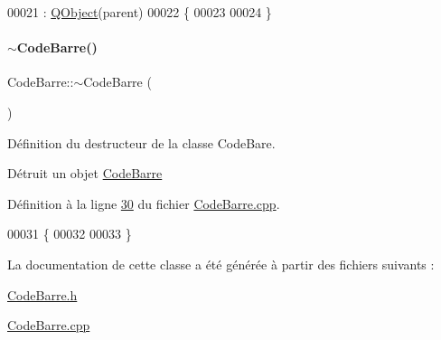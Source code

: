 \begin{DoxyCode}
00021                                     : \hyperlink{class_q_object}{QObject}(parent)
00022 \{
00023 
00024 \}
\end{DoxyCode}
\mbox{\label{class_code_barre_a5bb3df2e5c7fba829f0274da4c359f6c}} 
\paragraph{\texorpdfstring{$\sim$\+Code\+Barre()}{~CodeBarre()}}
{\footnotesize\ttfamily Code\+Barre\+::$\sim$\+Code\+Barre (\begin{DoxyParamCaption}{ }\end{DoxyParamCaption})}



Définition du destructeur de la classe Code\+Bare. 

Détruit un objet \hyperlink{class_code_barre}{Code\+Barre} 

Définition à la ligne \hyperlink{_code_barre_8cpp_source_l00030}{30} du fichier \hyperlink{_code_barre_8cpp_source}{Code\+Barre.\+cpp}.


\begin{DoxyCode}
00031 \{
00032 
00033 \}
\end{DoxyCode}


La documentation de cette classe a été générée à partir des fichiers suivants \+:\begin{DoxyCompactItemize}
\item 
\hyperlink{_code_barre_8h}{Code\+Barre.\+h}\item 
\hyperlink{_code_barre_8cpp}{Code\+Barre.\+cpp}\end{DoxyCompactItemize}
